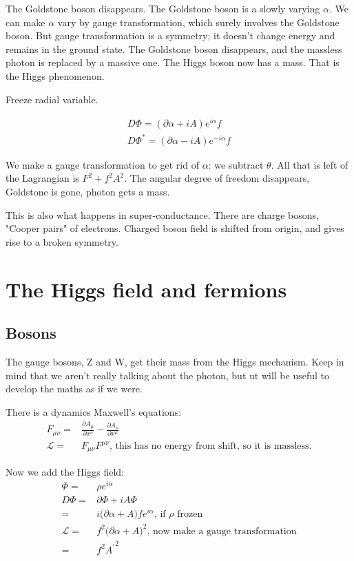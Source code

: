 \documentclass[]{article}
\begin{document}
The Goldstone boson disappears. The Goldstone boson is a slowly varying $\alpha$. We can make $\alpha$ vary by gauge transformation, which surely involves the Goldstone boson. But gauge transformation is a symmetry; it doesn't change energy and remains in the ground state. The Goldstone boson disappears, and the massless photon is replaced by a massive one. The Higgs boson now has a mass. That is the Higgs phenomenon.


Freeze radial variable.

\begin{align*}
	D \Phi = (\partial \alpha + iA)e^{i\alpha}f\\
	D \Phi^* = (\partial \alpha - iA)e^{-i\alpha}f
\end{align*}

We make a gauge transformation to get rid of $\alpha$: we subtract $\theta$. All that is left of the Lagrangian is $F^2+f^2A^2$. The angular degree of freedom disappears, Goldstone is gone, photon gets a mass.

This is also what happens in super-conductance. There are charge bosons, "Cooper pairs" of electrons. Charged boson field is shifted from origin, and gives rise to a broken symmetry.


\section{The Higgs field and fermions}

\subsection{Bosons}

The gauge bosons, Z and W, get their mass from the Higgs mechanism. Keep in mind that we aren't really talking about the photon, but ut will be useful to develop the maths as if we were.

There is a dynamics Maxwell's equations:
\begin{align*}
	F_{\mu\nu}=&\frac{\partial A_\mu}{\partial x^\nu}-\frac{\partial A_\nu}{\partial x^\mu}\\
	\mathcal{L} =& F_{\mu\nu} F^{\mu\nu} \text{, this has no energy from shift, so it is massless.}
\end{align*}

Now we add the Higgs field:
\begin{align*}
	\Phi =& \rho e^{i \alpha}\\
	D \Phi =& \partial \Phi + i A \Phi\\
	=& i \big( \partial \alpha + A \big) f e^{i \alpha} \text{, if $\rho$ frozen}\\
	\mathcal{L} =& f^2 \big(\partial \alpha + A \big)^2 \text{, now make a gauge transformation}\\
	=& f^2 {A^\prime}^2
\end{align*}
\end{document}
